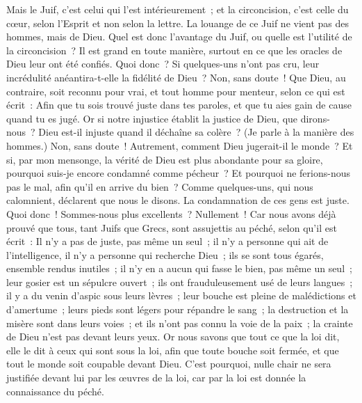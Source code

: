 \begin{multicols}{2}
Mais le Juif, c'est celui qui l'est intérieurement~; et la circoncision, c'est celle du cœur, selon l'Esprit et non selon la lettre. La louange de ce Juif ne vient pas des hommes, mais de Dieu.
\VerseOne{}Quel est donc l'avantage du Juif, ou quelle est l'utilité de la circoncision~?
Il est grand en toute manière, surtout en ce que les oracles de Dieu leur ont été confiés.
Quoi donc~? Si quelques-uns n'ont pas cru, leur incrédulité anéantira-t-elle la fidélité de Dieu~?
Non, sans doute~! Que Dieu, au contraire, soit reconnu pour vrai, et tout homme pour menteur, selon ce qui est écrit~: Afin que tu sois trouvé juste dans tes paroles, et que tu aies gain de cause quand tu es jugé.
Or si notre injustice établit la justice de Dieu, que dirons-nous~? Dieu est-il injuste quand il déchaîne sa colère~? (Je parle à la manière des hommes.)
Non, sans doute~! Autrement, comment Dieu jugerait-il le monde~?
Et si, par mon mensonge, la vérité de Dieu est plus abondante pour sa gloire, pourquoi suis-je encore condamné comme pécheur~?
Et pourquoi ne ferions-nous pas le mal, afin qu'il en arrive du bien~? Comme quelques-uns, qui nous calomnient, déclarent que nous le disons. La condamnation de ces gens est juste.
Quoi donc~! Sommes-nous plus excellents~? Nullement~! Car nous avons déjà prouvé que tous, tant Juifs que Grecs, sont assujettis au péché,
selon qu'il est écrit~: Il n'y a pas de juste, pas même un seul~;
il n'y a personne qui ait de l'intelligence, il n'y a personne qui recherche Dieu~;
ils se sont tous égarés, ensemble rendus inutiles~; il n'y en a aucun qui fasse le bien, pas même un seul~;
leur gosier est un sépulcre ouvert~; ils ont frauduleusement usé de leurs langues~; il y a du venin d'aspic sous leurs lèvres~;
leur bouche est pleine de malédictions et d'amertume~;
leurs pieds sont légers pour répandre le sang~;
la destruction et la misère sont dans leurs voies~;
et ils n'ont pas connu la voie de la paix~;
la crainte de Dieu n'est pas devant leurs yeux.
Or nous savons que tout ce que la loi dit, elle le dit à ceux qui sont sous la loi, afin que toute bouche soit fermée, et que tout le monde soit coupable devant Dieu.
C'est pourquoi, nulle chair ne sera justifiée devant lui par les œuvres de la loi, car par la loi est donnée la connaissance du péché.

\end{multicols}

